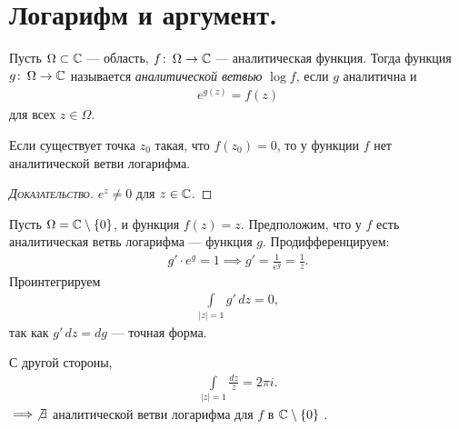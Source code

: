 \documentclass[../complex-analysis.tex]{subfiles}
\begin{document}
\section{Логарифм и аргумент.}

\begin{df}
 Пусть $ \Omega  \subset \mathbb{C}$ --- область, $ f \colon\, \Omega \to \mathbb{C}   $ --- аналитическая функция. Тогда функция $ g \colon\, \Omega \to \mathbb{C}   $ называется \textit{аналитической ветвью} $ \log f $, если $ g $ аналитична и
 \begin{align*}
  e^{g(z)} = f(z)
 \end{align*} для всех $ z \in \Omega $.
\end{df}
\begin{remrk}
 Если существует точка $ z_0 $ такая, что $ f(z_0) = 0 $, то у функции $ f $ нет аналитической ветви логарифма. 
\end{remrk}
\begin{proof}[\normalfont\textsc{Доказательство}]
 $ e^{z} \neq 0 $ для $ z \in \mathbb{C} $.
\end{proof}

\begin{exmpl}
 Пусть $ \Omega = \mathbb{C} \setminus \left\{ 0 \right\} $, и функция $ f(z) = z $. Предположим, что у $ f $ есть аналитическая ветвь логарифма --- функция $ g $. Продифференцируем:
 \begin{align*}
  g' \cdot e^{g} = 1 \implies g' = \frac{1}{e^{g}} = \frac{1}{z}.
 \end{align*} Проинтегрируем
 \begin{align*}
  \int\limits_{\left| z \right|=1} g'\,dz = 0,
 \end{align*} так как $ g'\,dz = dg $ --- точная форма.

 С другой стороны,
 \begin{align*}
  \int\limits_{\left| z \right|=1}   \frac{dz}{z} = 2\pi i.
\end{align*} $\implies \not \exists$ аналитической ветви логарифма для $f$ в $\mathbb{C} \setminus \left\{ 0 \right\} $ .   
\end{exmpl}
\end{document}
